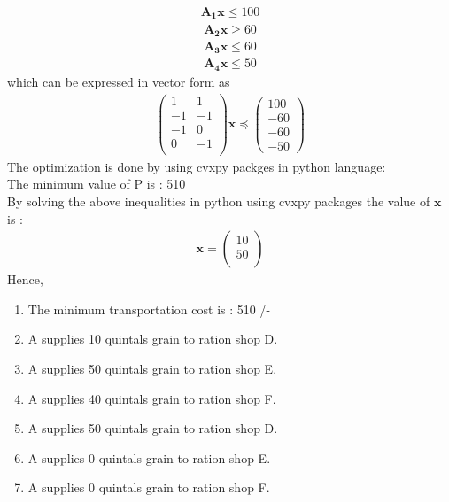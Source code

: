 \documentclass[journal,10pt,twocolumn]{article}
\let\vec\mathbf
\newcommand{\myvec}[1]{\ensuremath{\begin{pmatrix}#1\end{pmatrix}}}
\begin{document}
\begin{align}
\vec{A_1}\vec{x} \le 100
\end{align}
\begin{align}
\vec{A_2}\vec{x} \ge 60
\end{align}
\begin{align}
\vec{A_3}\vec{x} \le 60
\end{align}
\begin{align}
\vec{A_4}\vec{x} \le 50
\end{align}
which can be expressed in vector form as
\begin{align}
 \myvec{1 &1 \\ -1 & -1 \\ -1 & 0 \\ 0 & -1 \\} \vec{x}\preceq \myvec{100 \\ -60 \\ -60 \\ -50}
\end{align}
The optimization is done by using cvxpy packges in python language: \\
The minimum value of P is  : 510 \\
By solving the above inequalities in python using cvxpy packages the value of $\vec{x}$ is :
\begin{align}
\vec{x} = 
\begin{pmatrix}
10 \\
50 \\
\end{pmatrix}
\end{align}
Hence,
\begin{enumerate}
\item The minimum transportation cost is : 510 /-
\item A supplies 10 quintals grain to ration shop D.
\item A supplies 50 quintals grain to ration shop E.
\item A supplies 40 quintals grain to ration shop F.
\item A supplies 50 quintals grain to ration shop D.
\item A supplies 0 quintals grain to ration shop E.
\item A supplies 0 quintals grain to ration shop F.
\end{enumerate}
\end{document}
